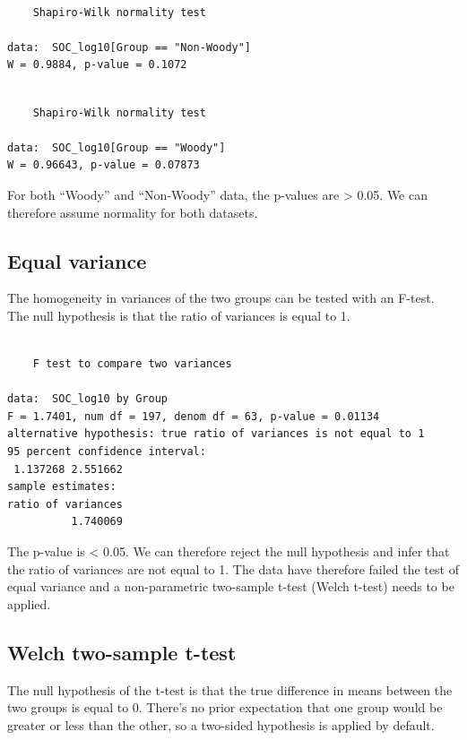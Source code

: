 \documentclass[
  letterpaper,
  DIV=11,
  numbers=noendperiod]{scrartcl}
\begin{document}
\begin{verbatim}

    Shapiro-Wilk normality test

data:  SOC_log10[Group == "Non-Woody"]
W = 0.9884, p-value = 0.1072
\end{verbatim}

\begin{verbatim}

    Shapiro-Wilk normality test

data:  SOC_log10[Group == "Woody"]
W = 0.96643, p-value = 0.07873
\end{verbatim}

For both ``Woody'' and ``Non-Woody'' data, the p-values are
\textgreater{} 0.05. We can therefore assume normality for both
datasets.

\subsection{Equal variance}\label{equal-variance}

The homogeneity in variances of the two groups can be tested with an
F-test. The null hypothesis is that the ratio of variances is equal to
1.

\begin{verbatim}

    F test to compare two variances

data:  SOC_log10 by Group
F = 1.7401, num df = 197, denom df = 63, p-value = 0.01134
alternative hypothesis: true ratio of variances is not equal to 1
95 percent confidence interval:
 1.137268 2.551662
sample estimates:
ratio of variances 
          1.740069 
\end{verbatim}

The p-value is \textless{} 0.05. We can therefore reject the null
hypothesis and infer that the ratio of variances are not equal to 1. The
data have therefore failed the test of equal variance and a
non-parametric two-sample t-test (Welch t-test) needs to be applied.

\subsection{Welch two-sample t-test}\label{welch-two-sample-t-test}

The null hypothesis of the t-test is that the true difference in means
between the two groups is equal to 0. There's no prior expectation that
one group would be greater or less than the other, so a two-sided
hypothesis is applied by default.
\end{document}
